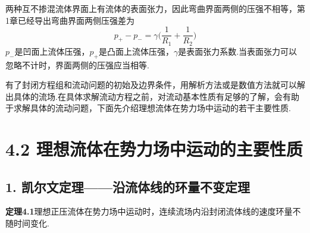两种互不掺混流体界面上有流体的表面张力，因此弯曲界面两侧的压强不相等，第1章已经导出弯曲界面两侧压强差为
\begin{equation*}
p_{+}-p_{-}=\gamma\Big(\frac{1}{R_1}+\frac{1}{R_2}\Big)
\tag{4.19}
\end{equation*}
$p_{-}$是凹面上流体压强，$p_{+}$是凸面上流体压强，$\gamma$是表面张力系数.当表面张力可以忽略不计时，界面两侧的压强应当相等.

有了封闭方程组和流动问题的初始及边界条件，用解析方法或是数值方法就可以解出具体的流场.在具体求解流动方程之前，对流动基本性质有足够的了解，会有助于求解具体的流动问题，下面先介绍理想流体在势力场中运动的若干主要性质.

\section*{4.2  理想流体在势力场中运动的主要性质}

\subsection*{1. 凯尔文定理——沿流体线的环量不变定理}

\noindent\textbf{定理4.1}\quad 理想正压流体在势力场中运动时，连续流场内沿封闭流体线的速度环量不随时间变化.

